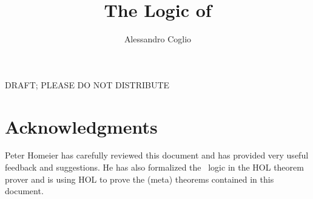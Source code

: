 \documentclass{article}
\begin{document}
\title{The Logic of \MS}
\author{Alessandro Coglio}
\maketitle

\begin{center}
{\Large DRAFT; PLEASE DO NOT DISTRIBUTE}
\end{center}








\appendix



\section*{Acknowledgments}

Peter Homeier has carefully reviewed this document and has provided very
useful feedback and suggestions. He has also formalized the \MS\ logic in the
HOL theorem prover and is using HOL to prove the (meta) theorems contained in
this document.

%


\end{document}
